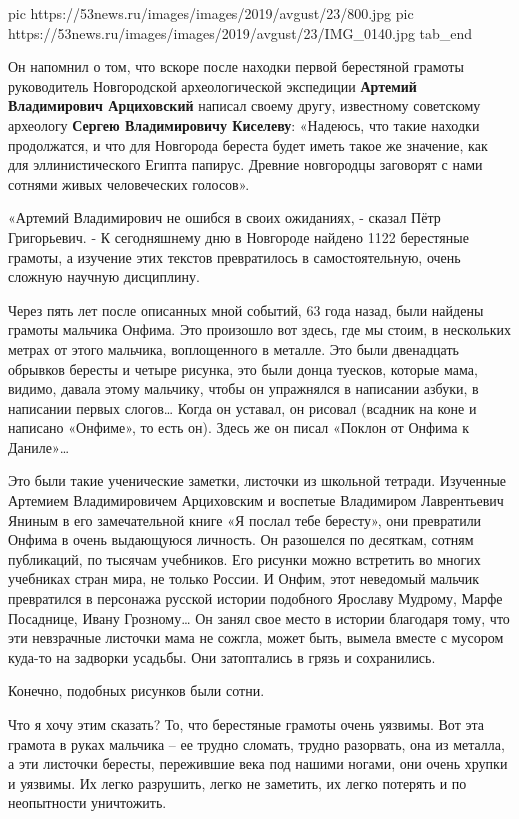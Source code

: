   pic https://53news.ru/images/images/2019/avgust/23/800.jpg
  pic https://53news.ru/images/images/2019/avgust/23/IMG_0140.jpg
tab_end
\fi

Он напомнил о том, что вскоре после находки первой берестяной грамоты
руководитель Новгородской археологической экспедиции \textbf{Артемий Владимирович
Арциховский} написал своему другу, известному советскому археологу \textbf{Сергею
Владимировичу Киселеву}: «Надеюсь, что такие находки продолжатся, и что для
Новгорода береста будет иметь такое же значение, как для эллинистического
Египта папирус. Древние новгородцы заговорят с нами сотнями живых человеческих
голосов». 

«Артемий Владимирович не ошибся в своих ожиданиях, - сказал Пётр Григорьевич. -
К сегодняшнему дню в Новгороде найдено 1122 берестяные грамоты, а изучение этих
текстов превратилось в самостоятельную, очень сложную научную дисциплину.

Через пять лет после описанных мной событий, 63 года назад, были найдены
грамоты мальчика Онфима. Это произошло вот здесь, где мы стоим, в нескольких
метрах от этого мальчика, воплощенного в металле. Это были двенадцать обрывков
бересты и четыре рисунка, это были донца туесков, которые мама, видимо, давала
этому мальчику, чтобы он упражнялся в написании азбуки, в написании первых
слогов… Когда он уставал, он рисовал (всадник на коне и написано «Онфиме», то
есть он). Здесь же он писал «Поклон от Онфима к Даниле»…

Это были такие ученические заметки, листочки из школьной тетради. Изученные
Артемием Владимировичем Арциховским и воспетые Владимиром Лаврентьевич Яниным в
его замечательной книге «Я послал тебе бересту», они превратили Онфима в очень
выдающуюся личность. Он разошелся по десяткам, сотням публикаций, по тысячам
учебников. Его рисунки можно встретить во многих учебниках стран мира, не
только России. И Онфим, этот  неведомый мальчик превратился в персонажа русской
истории подобного Ярославу Мудрому, Марфе Посаднице, Ивану Грозному… Он занял
свое место в истории благодаря тому, что эти невзрачные листочки мама не
сожгла, может быть, вымела вместе с мусором куда-то на задворки усадьбы. Они
затоптались в грязь и сохранились.

Конечно, подобных рисунков были сотни.

Что я хочу этим сказать? То, что берестяные грамоты очень уязвимы. Вот эта
грамота в руках мальчика – ее трудно сломать, трудно разорвать, она из металла,
а эти листочки бересты, пережившие века под нашими ногами, они очень хрупки и
уязвимы. Их легко разрушить, легко не заметить, их легко потерять и по
неопытности уничтожить.

